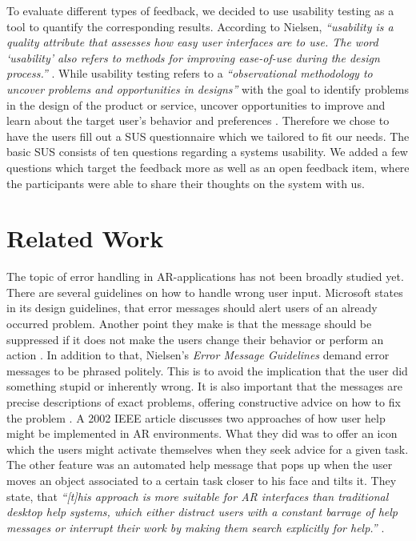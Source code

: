 \documentclass[11pt, a4paper]{article}
\begin{document}
		To evaluate different types of feedback, we decided to use usability testing as a tool to quantify the corresponding results. According to Nielsen, \textit{``usability is a quality attribute that assesses how easy user interfaces are to use. The word `usability' also refers to methods for improving ease-of-use during the design process.''} \cite{Nielsen2012}. While usability testing refers to a \textit{``observational methodology to uncover problems and opportunities in designs''} with the goal to identify problems in the design of the product or service, uncover opportunities to improve and learn about the target user's behavior and preferences \cite{Moran2019}. Therefore we chose to have the users fill out a \ac{SUS} questionnaire which we tailored to fit our needs. The basic \ac{SUS} consists of ten questions regarding a systems usability. We added a few questions which target the feedback more as well as an open feedback item, where the participants were able to share their thoughts on the system with us. 

	\section*{Related Work}\label{sec:relatedwork}
		The topic of error handling in \ac{AR}-applications has not been broadly studied yet. There are several guidelines on how to handle wrong user input. Microsoft states in its design guidelines, that error messages should alert users of an already occurred problem. Another point they make is that the message should be suppressed if it does not make the users change their behavior or perform an action \cite{Microsoft2018}. In addition to that, Nielsen's \textit{Error Message Guidelines} demand error messages to be phrased politely. This is to avoid the implication that the user did something stupid or inherently wrong. It is also important that the messages are precise descriptions of exact problems, offering constructive advice on how to fix the problem \cite{Nielsen2001}. A 2002 IEEE article discusses two approaches of how user help might be implemented in \ac{AR} environments. What they did was to offer an icon which the users might activate themselves when they seek advice for a given task. The other feature was an automated help message that pops up when the user moves an object associated to a certain task closer to his face and tilts it. They state, that \textit{``\textnormal{[t]}his approach is more suitable for AR interfaces than traditional desktop help systems, which either distract users with a constant barrage of help messages or interrupt their work by making them search explicitly for help.''} \cite{Poupyrev2002}.
\end{document}
